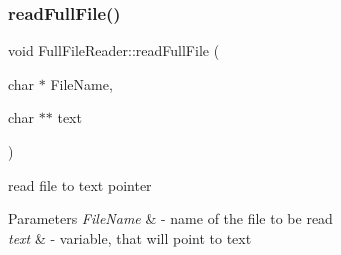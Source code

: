 \subsubsection{\texorpdfstring{read\+Full\+File()}{readFullFile()}}
{\footnotesize\ttfamily void Full\+File\+Reader\+::read\+Full\+File (\begin{DoxyParamCaption}\item[{char $\ast$}]{File\+Name,  }\item[{char $\ast$$\ast$}]{text }\end{DoxyParamCaption})}

read file to text pointer 
\begin{DoxyParams}{Parameters}
{\em File\+Name} & -\/ name of the file to be read \\
\hline
{\em text} & -\/ variable, that will point to text \\
\hline
\end{DoxyParams}
